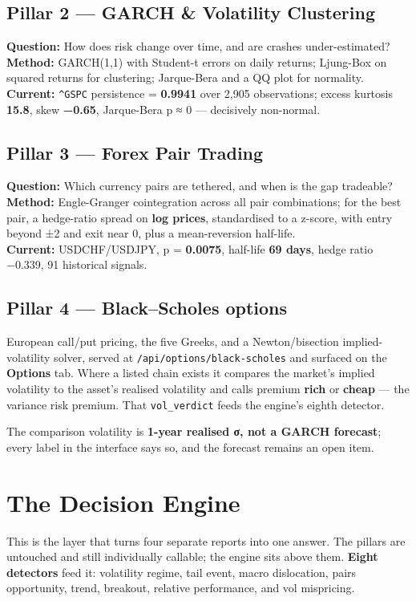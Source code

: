 \documentclass[11pt]{article}
\newcommand{\tk}[1]{\texttt{#1}}
\begin{document}
\subsection{Pillar 2 — GARCH \& Volatility Clustering}
\textbf{Question:} How does risk change over time, and are crashes under-estimated? \\
\textbf{Method:} GARCH(1,1) with Student-t errors on daily returns; Ljung-Box on
squared returns for clustering; Jarque-Bera and a QQ plot for normality. \\
\textbf{Current:} \tk{\textasciicircum{}GSPC} persistence = \textbf{0.9941} over 2{,}905
observations; excess kurtosis \textbf{15.8}, skew \textbf{−0.65}, Jarque-Bera
p ≈ 0 — decisively non-normal.

\subsection{Pillar 3 — Forex Pair Trading}
\textbf{Question:} Which currency pairs are tethered, and when is the gap tradeable? \\
\textbf{Method:} Engle-Granger cointegration across all pair combinations; for the
best pair, a hedge-ratio spread on \textbf{log prices}, standardised to a z-score,
with entry beyond ±2 and exit near 0, plus a mean-reversion half-life. \\
\textbf{Current:} USDCHF/USDJPY, p = \textbf{0.0075}, half-life \textbf{69 days},
hedge ratio −0.339, 91 historical signals.

\subsection{Pillar 4 — Black--Scholes options}
European call/put pricing, the five Greeks, and a Newton/bisection implied-volatility
solver, served at \tk{/api/options/black-scholes} and surfaced on the \textbf{Options}
tab. Where a listed chain exists it compares the market's implied volatility to the
asset's realised volatility and calls premium \textbf{rich} or \textbf{cheap} — the
variance risk premium. That \tk{vol\_verdict} feeds the engine's eighth detector.

The comparison volatility is \textbf{1-year realised σ, not a GARCH forecast}; every
label in the interface says so, and the forecast remains an open item.

\section{The Decision Engine}
This is the layer that turns four separate reports into one answer. The pillars are
untouched and still individually callable; the engine sits above them. \textbf{Eight
detectors} feed it: volatility regime, tail event, macro dislocation, pairs
opportunity, trend, breakout, relative performance, and vol mispricing.
\end{document}
